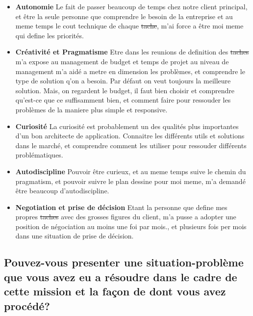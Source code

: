 \documentclass{resume} %
\providecommand{\DIFaddtex}[1]{{\protect\color{blue}\uwave{#1}}} %
\providecommand{\DIFdeltex}[1]{{\protect\color{red}\sout{#1}}}                      %
\providecommand{\DIFaddbegin}{} %
\providecommand{\DIFaddend}{} %
\providecommand{\DIFdelbegin}{} %
\providecommand{\DIFdelend}{} %
\providecommand{\DIFadd}[1]{\texorpdfstring{\DIFaddtex{#1}}{#1}} %
\providecommand{\DIFdel}[1]{\texorpdfstring{\DIFdeltex{#1}}{}} %
\begin{document}
		 \begin{itemize}  				
			\item \textbf{Autonomie} \newline
				Le fait de passer beaucoup de temps chez notre client principal, et être la seule personne que comprendre le besoin de la entreprise et au meme temps le cout technique de chaque \DIFdelbegin \DIFdel{tache}\DIFdelend \DIFaddbegin \DIFadd{tâche}\DIFaddend , m'ai force a être moi meme qui define les priorités. 
			\item \textbf{Créativité et Pragmatisme } \newline
				Etre dans les reunions de definition des \DIFdelbegin \DIFdel{taches }\DIFdelend \DIFaddbegin \DIFadd{tâches }\DIFaddend m'a expose au management de budget et temps de projet au niveau de management m'a aidé a metre en dimension les problèmes, et comprendre le type de solution q'on a besoin. Par défaut on veut toujours la meilleure solution. Mais, on regardent le budget, il faut bien choisir et comprendre qu'est-ce que ce suffisamment bien, et comment faire pour ressouder les problèmes de la maniere plus simple et responsive. 
			\item \textbf{Curiosité } \newline
				La curiosité est probablement un des qualités plus importantes d'un bon architecte de application. Connaitre les différents utils et solutions dans le marché, et comprendre comment les utiliser pour ressouder différents problématiques.
			\item \textbf{Autodiscipline} \newline
				Pouvoir être curieux, et au meme temps suive le chemin du pragmatism, et pouvoir suivre le plan dessine pour moi meme, m'a demandé être  beaucoup d'autodiscipline.
			\item \textbf{Negotiation  et prise de décision } \newline
				Etant la personne que define mes propres \DIFdelbegin \DIFdel{taches }\DIFdelend \DIFaddbegin \DIFadd{tâches }\DIFaddend avec des grosses figures du client, m'a pusse a adopter une position de négociation au moins une foi par mois., et plusieurs fois per mois dans une situation de prise de décision.  
		 \end{itemize} 

	\subsection{Pouvez-vous presenter une situation-problème que vous avez eu a résoudre dans le cadre de cette mission et la façon de dont vous avez procédé?}
\end{document}
